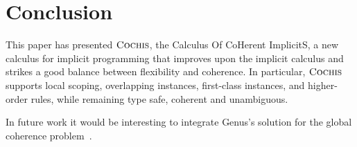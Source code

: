 \section{Conclusion}
\label{sec:conclusion}

This paper has presented $\textsc{Cochis}$, the Calculus Of CoHerent ImplicitS, a new
calculus for implicit programming that improves upon the implicit calculus and
strikes a good balance between flexibility and coherence. In particular,
$\textsc{Cochis}$ supports local scoping, overlapping instances, first-class
instances, and higher-order rules, while remaining type safe, coherent and
unambiguous.

In future work it would be interesting to integrate Genus's solution for the
global coherence problem~\cite{Zhang15LFO}.

 





%
% 
% 






